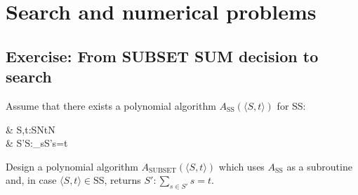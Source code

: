\section{Search and numerical problems}
\subsection{Exercise: From SUBSET SUM decision to search}
Assume that there exists a polynomial algorithm $A_{\mathrm{SS}}(\langle S,t\rangle)$ for SS:

\begin{notesproblem}
 & \langle S,t\rangle:S\subseteq\mathbb Nt\in\mathbb N\\
 & \exists S'\subseteq S:\sum_{s\in S'}s=t
\end{notesproblem}

Design a polynomial algorithm $A_{\mathrm{SUBSET}}(\langle S,t\rangle)$ which uses $A_{\mathrm{SS}}$ as a subroutine and, in case $\langle S,t\rangle\in\mathrm{SS}$, returns $S':\sum_{s\in S'}s=t$.
